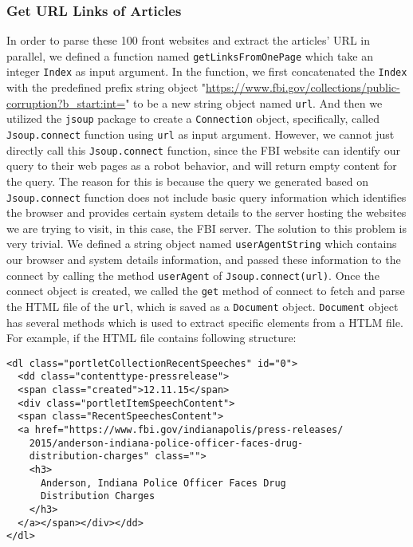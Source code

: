 \subsubsection{Get URL Links of Articles}
In order to parse these 100 front websites and extract the articles' URL in parallel, 
we defined a function named \texttt{getLinksFromOnePage} which take an integer 
\texttt{Index} as input argument. In the function, we first concatenated the 
\texttt{Index} with the predefined prefix string object 
"\url{https://www.fbi.gov/collections/public-corruption?b_start:int=}" to be a
new string object named \texttt{url}. And then we utilized the \texttt{jsoup}
package to create a \texttt{Connection} object, specifically, called 
\texttt{Jsoup.connect} function using \texttt{url} as input argument. However,
we cannot just directly call this \texttt{Jsoup.connect} function, since the FBI
website can identify our query to their web pages as a robot behavior, and will return 
empty content for the query. The reason for this is because the query we generated
based on \texttt{Jsoup.connect} function does not include basic query information
which identifies the browser and provides certain system details to the server 
hosting the websites we are trying to visit, in this case, the FBI server. The
solution to this problem is very trivial. We defined a string object named 
\texttt{userAgentString} which contains our browser and system details information, 
and passed these information to the connect by calling the method \texttt{userAgent}
of \texttt{Jsoup.connect(url)}. Once the connect object is created, we called the
\texttt{get} method of connect to fetch and parse the HTML file of the \texttt{url},
which is saved as a \texttt{Document} object. \texttt{Document} object has several
methods which is used to extract specific elements from a HTLM file. For example,
if the HTML file contains following structure:
\begin{framed}
\begin{center}
\begin{verbatim}
<dl class="portletCollectionRecentSpeeches" id="0">
  <dd class="contenttype-pressrelease">
  <span class="created">12.11.15</span>
  <div class="portletItemSpeechContent">
  <span class="RecentSpeechesContent">
  <a href="https://www.fbi.gov/indianapolis/press-releases/
    2015/anderson-indiana-police-officer-faces-drug-
    distribution-charges" class="">
    <h3>
      Anderson, Indiana Police Officer Faces Drug 
      Distribution Charges
    </h3>
  </a></span></div></dd>
</dl>
\end{verbatim}
\end{center}
\end{framed}
